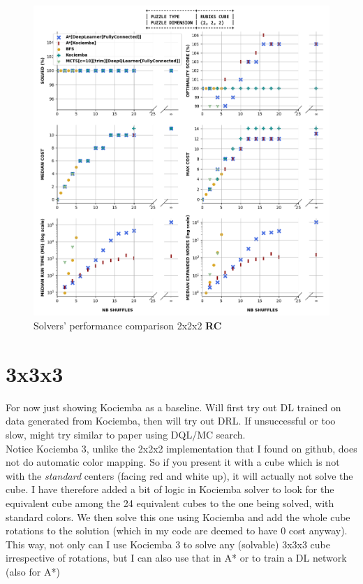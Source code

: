 \begin{figure}[H]
\centering
\includegraphics[scale=0.60]{./Figures/222RCPerformance}
\caption[222RCPerformance]{Solvers' performance comparison 2x2x2 \textbf{RC}}
\label{fig:222RCPerformance}
\end{figure}



\section{3x3x3}
\label{sec:ResRubiks333}

For now just showing Kociemba as a baseline. Will first try out DL trained on data generated from Kociemba, then will try out DRL. If unsuccessful or too slow, might try similar to paper using DQL/MC search.
\\
Notice Kociemba 3, unlike the 2x2x2 implementation that I found on github, does not do automatic color mapping. So if you present it with a cube which is not with the \textit{standard} centers (facing red and white up), it will actually not solve the cube. I have therefore added a bit of logic in Kociemba solver to look for the equivalent cube among the 24 equivalent cubes to the one being solved, with standard colors. We then solve this one using Kociemba and add the whole cube rotations to the solution (which in my code are deemed to have 0 cost anyway). This way, not only can I use Kociemba 3 to solve any (solvable) 3x3x3 cube irrespective of rotations, but I can also use that in A* or to train a DL network (also for A*)




